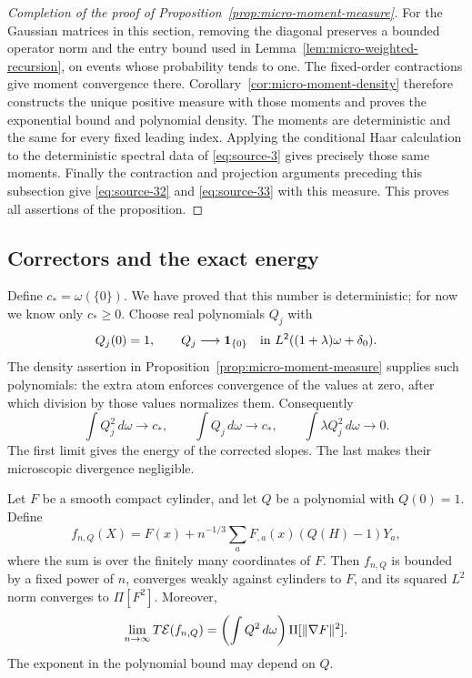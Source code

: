 \begin{proof}[Completion of the proof of Proposition~\ref{prop:micro-moment-measure}]
For the Gaussian matrices in this section, removing the diagonal preserves
a bounded operator norm and the entry bound used in
Lemma~\ref{lem:micro-weighted-recursion}, on events whose probability tends
to one. The fixed-order contractions give moment convergence there.
Corollary~\ref{cor:micro-moment-density} therefore constructs the unique
positive measure with those moments and proves the exponential bound and
polynomial density. The moments are deterministic and the same for every
fixed leading index. Applying the conditional Haar calculation to the
deterministic spectral data of \eqref{eq:source-3} gives precisely those
same moments. Finally the contraction and projection arguments preceding
this subsection give \eqref{eq:source-32} and \eqref{eq:source-33} with this
measure. This proves all assertions of the proposition.
\end{proof}



\subsection{Correctors and the exact energy}

Define $c_*=\omega(\{0\})$. We have proved that this number is deterministic;
for now we know only $c_*\ge0$. Choose real polynomials $Q_j$ with
\begin{equation}
 Q_j(0)=1,
 \qquad
 Q_j\longrightarrow\mathbf 1_{\{0\}}
       \quad\hbox{in }L^2((1+\lambda)\omega+\delta_0).
 \label{eq:micro-zero-polynomials}
\end{equation}
The density assertion in Proposition~\ref{prop:micro-moment-measure}
supplies such polynomials: the extra atom enforces convergence of the
values at zero, after which division by those values normalizes them.
Consequently
\[
 \int Q_j^2\,d\omega\to c_*,
 \qquad \int Q_j\,d\omega\to c_*,
 \qquad \int\lambda Q_j^2\,d\omega\to0.
\]
The first limit gives the energy of the corrected slopes. The last makes
their microscopic divergence negligible.

\begin{lemma}
\label{lem:micro-recovery}
Let $F$ be a smooth compact cylinder, and let $Q$ be a polynomial with
$Q(0)=1$. Define
\begin{equation}
 f_{n,Q}(X)=F(x)+n^{-1/3}\sum_aF_{,a}(x)(Q(H)-1)Y_a,
 \label{eq:source-39}
\end{equation}
where the sum is over the finitely many coordinates of $F$.
Then $f_{n,Q}$ is bounded by a fixed power of $n$, converges weakly against
cylinders to $F$, and its squared $L^2$ norm converges to $\Pi[F^2]$.
Moreover,
\[
 \lim_{n\to\infty}T\mathcal E(f_{n,Q})
       =\left(\int Q^2\,d\omega\right)\Pi[\|\nabla F\|^2].
\]
The exponent in the polynomial bound may depend on $Q$.
\end{lemma}

